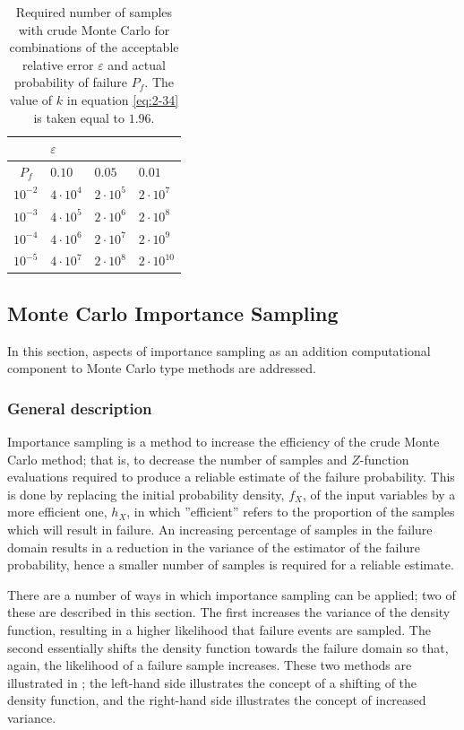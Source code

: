 \begin{longtable}{|p{0.6in}|p{0.4in}|p{0.4in}|p{0.4in}|}
\caption{Required number of samples with crude Monte Carlo for combinations of the acceptable relative error $\varepsilon$ and actual probability of failure $P_f$. The value of $k$ in equation \eqref{eq:2-34} is taken equal to $1.96$.} \label{tab:2.3} \\ \hline 
~ & \multicolumn{3}{|p{1.5in}|}{$\varepsilon$} \\ \hline 
~$P_f$ & $0.10$ & $0.05$ & $0.01$ \\ \hline 
$10^{-2}$ & $4\cdot10^{4}$ & $2\cdot10^{5}$ & $2\cdot10^{7}$ \\ \hline 
$10^{-3}$ & $4\cdot10^{5}$ & $2\cdot10^{6}$ & $2\cdot10^{8}$ \\ \hline 
$10^{-4}$ & $4\cdot10^{6}$ & $2\cdot10^{7}$ & $2\cdot10^{9}$ \\ \hline
$10^{-5}$ & $4\cdot10^{7}$ & $2\cdot10^{8}$ & $2\cdot10^{10}$ \\ \hline
\end{longtable}

\subsection{Monte Carlo Importance Sampling}\label{Section_2.3.4}
In this section, aspects of importance sampling as an addition computational component to Monte Carlo type methods are addressed.

\subsubsection{General description}\label{Section_2.3.4.1}
Importance sampling is a method to increase the efficiency of the crude Monte Carlo method; that is, to decrease the number of samples and $Z$-function evaluations required to produce a reliable estimate of the failure probability. This is done by replacing the initial probability density, $f_X$, of the input variables by a more efficient one, $h_X$, in which ''efficient'' refers to the proportion of the samples which will result in failure. An increasing percentage of samples in the failure domain results in a reduction in the variance of the estimator of the failure probability, hence a smaller number of samples is required for a reliable estimate. 

There are a number of ways in which importance sampling can be applied; two of these are described in this section. The first increases the variance of the density function, resulting in a higher likelihood that failure events are sampled. The second essentially shifts the density function towards the failure domain so that, again, the likelihood of a failure sample increases. These two methods are illustrated in ; the left-hand side illustrates the concept of a shifting of the density function, and the right-hand side illustrates the concept of increased variance. 

